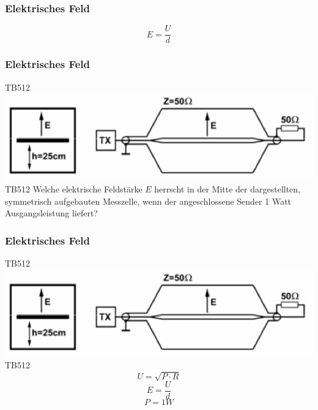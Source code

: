 \begin{frame}
    \frametitle{Elektrisches Feld}
    \begin{center}
        \huge $$E = \frac{U}{d}$$
    \end{center}
\end{frame}

\begin{frame}
    \frametitle{Elektrisches Feld}
    \begin{center}
	\begin{block}{TB512}
        \includegraphics[width=1\textwidth]{a08/TB512.png}\\
        \tiny TB512 \hyperlink{refs}{\cite{bna}}
   		\large Welche elektrische Feldstärke $E$ herrscht in der Mitte der dargestellten, symmetrisch aufgebauten Messzelle, wenn der angeschlossene Sender 1 Watt Ausgangsleistung liefert? 
	\end{block}
    \end{center}
\end{frame}

\begin{frame}
    \frametitle{Elektrisches Feld}
    \begin{center}
	\begin{block}{TB512}
	     \includegraphics[width=1\textwidth]{a08/TB512.png}\\
        \tiny TB512 \hyperlink{refs}{\cite{bna}}\\ \large
		$$U = \sqrt{P \cdot R}$$
		$$E = \frac{U}{d}$$
		$$P = 1W$$
	\end{block}
    \end{center}
\end{frame}

